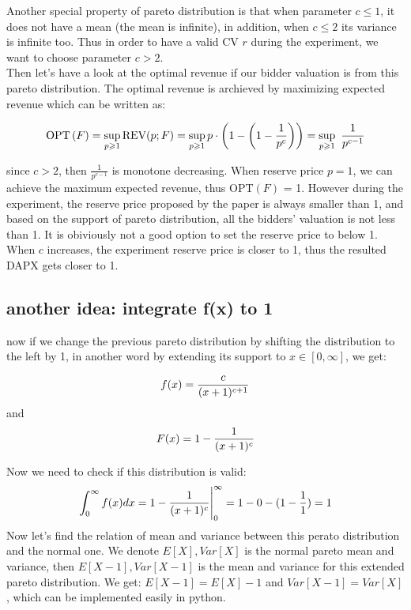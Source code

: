 Another special property of pareto distribution is that when parameter $c \leqslant 1$, it does not have a mean (the mean is infinite), in addition, when $c \leqslant 2$ its variance is infinite too. Thus in order to have a valid CV $r$ during the experiment, we want to choose parameter $c > 2$. \\
Then let's have a look at the optimal revenue if our bidder valuation is from this pareto distribution. The optimal revenue is archieved by maximizing expected revenue which can be written as:

\begin{equation}\notag
\text{OPT}\left(F\right) = \sup_{p \geqslant 1} \text{REV}(p;F) = \sup_{p \geqslant 1} p \cdot \left(1-\left(1- \frac{1}{p^c}\right)\right) =\sup_{p \geqslant 1} \ \frac{1}{p^{c-1}}
\end{equation}

since $c>2$, then $\frac{1}{p^{c-1}}$ is monotone decreasing. When reserve price $p = 1$, we can achieve the maximum expected revenue, thus OPT$(F)$ = 1. However during the experiment, the reserve price proposed by the paper is always smaller than 1, and based on the support of pareto distribution, all the bidders' valuation is not less than 1. It is obiviously not a good option to set the reserve price to below 1. When $c$ increases, the experiment reserve price is closer to 1, thus the resulted DAPX gets closer to 1. 

\subsection{another idea: integrate f(x) to 1}
now if we change the previous pareto distribution by shifting the distribution to the left by 1, in another word by extending its support to $x \in [0,\infty]$,
we get:

\begin{equation}\notag
f(x) = \frac{c}{(x+1)^{c+1}} 
\end{equation} 
and 
\begin{equation}\notag
F(x) = 1- \frac{1}{(x+1)^c}
\end{equation} 

Now we need to check if this distribution is valid:
\begin{equation}\notag
	\int_{0}^{\infty} f(x) dx = 1- \frac{1}{(x+1)^c} \Biggr|_{0}^{\infty}  = 1 - 0 -(1-\frac{1}{1}) = 1     
\end{equation}
Now let's find the relation of mean and variance between this perato distribution and the normal one. We denote $E[X], Var[X]$ is the normal pareto mean and variance, then $E[X-1], Var[X-1]$ is the mean and variance for this extended pareto distribution. We get: $E[X-1] = E[X] - 1$ and $Var[X-1] = Var[X]$, which can be implemented easily in python. 

